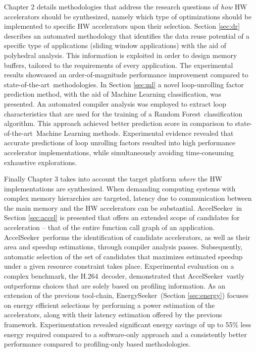 \documentclass[]{usiinfthesis}
\newcommand{\aseeker}{{AccelSeeker}}
\newcommand{\eseeker}{{EnergySeeker}}
\newcommand{\htsf}{{H.264}}
\newcommand{\SoTA}{{state-of-the-art}}
\newcommand{\RF}{{Random Forest}}
\begin{document}
Chapter 2 details methodologies that address the research questions of {\em how} HW
accelerators should be synthesized, namely which type of optimizations should be implemented
to specific HW accelerators upon their selection. Section \ref{sec:dr} describes an automated 
methodology that identifies the data reuse potential of a specific type of applications
(sliding window applications) with the aid of polyhedral analysis. This information is 
exploited in order to design memory buffers, tailored to the requirements of every application. 
The experimental results showcased an order-of-magnitude performance improvement compared to \SoTA\ 
methodologies.
In Section \ref{sec:ml} a novel loop-unrolling factor prediction 
method, with the aid of Machine Learning classification, was presented. An automated compiler
analysis was employed to extract loop characteristics that are used for the training of a \RF\ 
classification algorithm. 
This approach achieved better prediction score in comparison to \SoTA\ Machine Learning methods. 
Experimental evidence revealed that 
accurate predictions of loop unrolling factors resulted into high performance accelerator 
implementations, while simultaneously avoiding 
time-consuming exhaustive explorations.\par

Finally Chapter 3 takes into account the target platform {\em where} the HW implementations are 
synthesized. When demanding computing systems with complex memory hierarchies are targeted, 
latency due to communication between the main memory and the HW accelerators
can be substantial. \aseeker\ in Section \ref{sec:accel} is presented that offers an extended 
scope of candidates for acceleration -- that of the entire function call graph of an application. 
\aseeker\ performs the identification of candidate accelerators, as well as their area and speedup 
estimations, through compiler analysis passes. Subsequently, automatic selection of the set of 
candidates that maximizes estimated speedup under a given resource constraint takes place. 
Experimental evaluation on a complex benchmark, the \htsf\ decoder, demonstrated that 
\aseeker\ vastly outperforms choices that are solely based on profiling information.
As an extension of the previous tool-chain, \eseeker\ (Section \ref{sec:energy}) focuses on 
energy efficient selections by performing a power estimation of the accelerators, along with 
their latency estimation offered by the previous framework. Experimentation revealed significant 
energy savings of up to 55\% less energy required compared to a software-only approach and a 
consistently better performance compared to profiling-only based methodologies.\par
\end{document}
